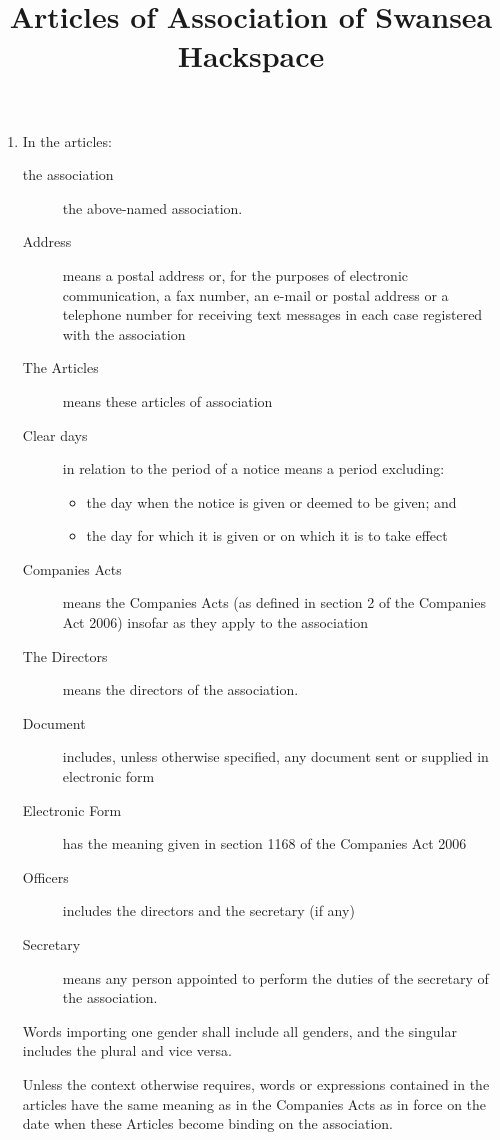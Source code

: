 \title{Articles of Association of Swansea Hackspace}
\begin{enumerate}
\section{Interpretation}
\item
  In the articles:
  \begin{description}
  \item[the association] the above-named association.
  \item[Address] means a postal address or, for the purposes of
    electronic communication, a fax number, an e-mail or postal address
    or a telephone number for receiving text messages in each case
    registered with the association
  \item[The Articles] means these articles of association
  \item[Clear days] in relation to the period of a notice means a period
    excluding:
    \begin{itemize}
    \item
      the day when the notice is given or deemed to be given; and
    \item
      the day for which it is given or on which it is to take effect
    \end{itemize}
  \item[Companies Acts] means the Companies Acts (as defined in section
    2 of the Companies Act 2006) insofar as they apply to the association
  \item[The Directors] means the directors of the association.
  \item[Document] includes, unless otherwise specified, any document sent or supplied in electronic form
  \item[Electronic Form] has the meaning given in section 1168 of the Companies Act 2006
  \item[Officers] includes the directors and the secretary (if any)
  \item[Secretary] means any person appointed to perform the duties of
    the secretary of the association.
  \end{description}
  Words importing one gender shall include all genders, and the singular
  includes the plural and vice versa.

  Unless the context otherwise requires, words or expressions
  contained in the articles have the same meaning as in the Companies
  Acts as in force on the date when these Articles become binding
  on the association.


\end{enumerate}
